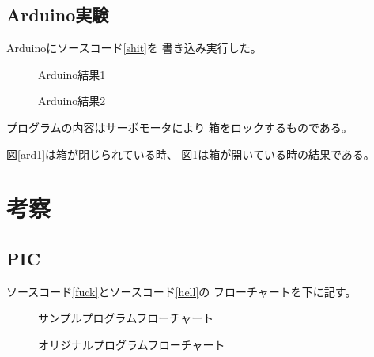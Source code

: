 \documentclass{jsarticle}
\begin{document}
\subsection{Arduino実験}
Arduinoにソースコード\ref{shit}を
書き込み実行した。\par

\begin{figure}[htbp]
		\begin{minipage}{0.5\hsize}
				\begin{center}
						\caption{Arduino結果1}
						\label{ard1}
				\end{center}
		\end{minipage}
		\begin{minipage}{0.5\hsize}
				\begin{center}
						\caption{Arduino結果2}
						\label{ard2}
				\end{center}
		\end{minipage}
\end{figure}

プログラムの内容はサーボモータにより
箱をロックするものである。\par
図\ref{ard1}は箱が閉じられている時、
図\ref{ard2}は箱が開いている時の結果である。

\section{考察}
\subsection{PIC}
ソースコード\ref{fuck}とソースコード\ref{hell}の
フローチャートを下に記す。

\begin{figure}[Htbp]
		\begin{minipage}{0.5\hsize}
				\begin{center}
						\caption{サンプルプログラムフローチャート}
						\label{flow1}
				\end{center}
		\end{minipage}
		\begin{minipage}{0.5\hsize}
				\begin{center}
						\caption{オリジナルプログラムフローチャート}
						\label{flow2}
				\end{center}
		\end{minipage}
\end{figure}
\end{document}

